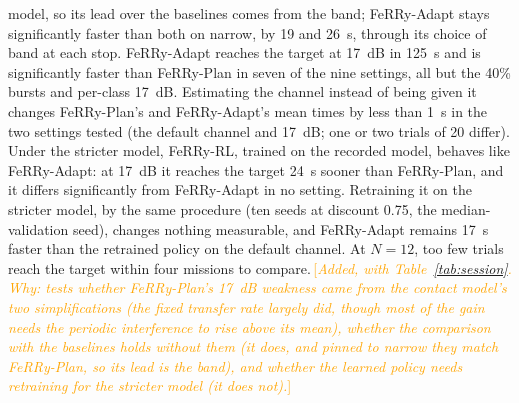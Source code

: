 \documentclass[conference]{IEEEtran}
\newcommand{\sysname}{FeRRy}
\newcommand{\changenote}[1]{\textcolor{orange}{\,[\emph{#1}]}}
\begin{document}
{model, so its lead over the baselines comes from the band; \sysname{}-Adapt
stays significantly faster than both on narrow, by 19 and 26~s, through its
choice of band at each stop. \sysname{}-Adapt reaches the target
at 17~dB in 125~s and is significantly faster than \sysname{}-Plan in seven of
the nine settings, all but the 40\% bursts and per-class 17~dB. Estimating the
channel instead of being given it changes \sysname{}-Plan's and
\sysname{}-Adapt's mean times by less than 1~s in the two settings tested (the
default channel and 17~dB; one or two trials of 20 differ). Under the stricter
model, \sysname{}-RL, trained on the recorded model, behaves like
\sysname{}-Adapt: at 17~dB it reaches the target 24~s sooner than
\sysname{}-Plan, and it differs significantly from \sysname{}-Adapt in no
setting. Retraining it on the stricter model, by the same procedure (ten seeds
at discount 0.75, the median-validation seed), changes nothing measurable, and
\sysname{}-Adapt remains 17~s faster than the retrained policy on the default
channel. At \(N=12\), too few trials reach the target within four missions to
compare.}\changenote{Added, with Table~\ref{tab:session}. Why: tests whether \sysname{}-Plan's 17~dB weakness came from the contact model's two simplifications (the fixed transfer rate largely did, though most of the gain needs the periodic interference to rise above its mean), whether the comparison with the baselines holds without them (it does, and pinned to narrow they match \sysname{}-Plan, so its lead is the band), and whether the learned policy needs retraining for the stricter model (it does not).}
\end{document}
